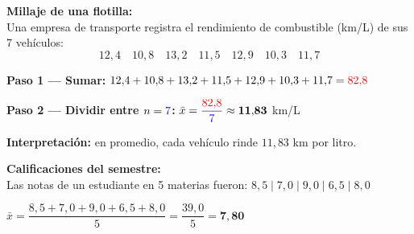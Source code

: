 \documentclass[12pt, letterpaper]{article}
\begin{document}
	\begin{ejemplo}
		\textbf{Millaje de una flotilla:}\\
		Una empresa de transporte registra el rendimiento de combustible
		(km/L) de sus 7 vehículos:
		\[12{,}4 \quad 10{,}8 \quad 13{,}2 \quad 11{,}5 \quad 12{,}9 \quad 10{,}3 \quad 11{,}7\]
		
		\textbf{Paso 1 — Sumar:}
		$12{,}4 + 10{,}8 + 13{,}2 + 11{,}5 + 12{,}9 + 10{,}3 + 11{,}7 = \textcolor{red}{82{,}8}$
		
		\textbf{Paso 2 — Dividir entre $n=\textcolor{blue}{7}$:}
		$\bar{x} = \dfrac{\textcolor{red}{82{,}8}}{\textcolor{blue}{7}} \approx \mathbf{11{,}83}$ km/L
		
		\textbf{Interpretación:} en promedio, cada vehículo rinde $11{,}83$ km por litro.
		
		\vspace{0.5cm}
		\textbf{Calificaciones del semestre:}\\
		Las notas de un estudiante en 5 materias fueron:
		$8{,}5 \;|\; 7{,}0 \;|\; 9{,}0 \;|\; 6{,}5 \;|\; 8{,}0$
		
		$\bar{x} = \dfrac{8{,}5 + 7{,}0 + 9{,}0 + 6{,}5 + 8{,}0}{5}
		= \dfrac{39{,}0}{5} = \mathbf{7{,}80}$
	\end{ejemplo}
	
\end{document}
